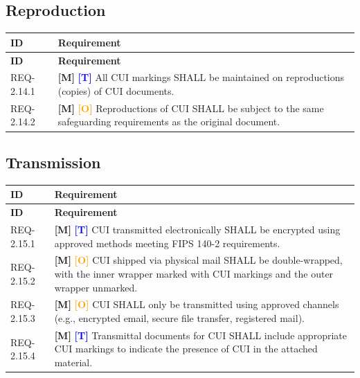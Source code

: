 \documentclass[11pt,letterpaper]{article}
\begin{document}
\subsection{Reproduction}

\begin{longtable}{@{}p{1.4cm}p{11.6cm}@{}}
\toprule
\textbf{ID} & \textbf{Requirement} \\
\midrule
\endfirsthead
\toprule
\textbf{ID} & \textbf{Requirement} \\
\midrule
\endhead

REQ-2.14.1 & \textcolor{mandatory}{\textbf{[M]}} \textcolor{blue}{\textbf{[T]}} All CUI markings SHALL be maintained on reproductions (copies) of CUI documents. \\[6pt]

REQ-2.14.2 & \textcolor{mandatory}{\textbf{[M]}} \textcolor{orange}{\textbf{[O]}} Reproductions of CUI SHALL be subject to the same safeguarding requirements as the original document. \\[6pt]

\bottomrule
\end{longtable}

\subsection{Transmission}

\begin{longtable}{@{}p{1.4cm}p{11.6cm}@{}}
\toprule
\textbf{ID} & \textbf{Requirement} \\
\midrule
\endfirsthead
\toprule
\textbf{ID} & \textbf{Requirement} \\
\midrule
\endhead

REQ-2.15.1 & \textcolor{mandatory}{\textbf{[M]}} \textcolor{blue}{\textbf{[T]}} CUI transmitted electronically SHALL be encrypted using approved methods meeting FIPS 140-2 requirements. \\[6pt]

REQ-2.15.2 & \textcolor{mandatory}{\textbf{[M]}} \textcolor{orange}{\textbf{[O]}} CUI shipped via physical mail SHALL be double-wrapped, with the inner wrapper marked with CUI markings and the outer wrapper unmarked. \\[6pt]

REQ-2.15.3 & \textcolor{mandatory}{\textbf{[M]}} \textcolor{orange}{\textbf{[O]}} CUI SHALL only be transmitted using approved channels (e.g., encrypted email, secure file transfer, registered mail). \\[6pt]

REQ-2.15.4 & \textcolor{mandatory}{\textbf{[M]}} \textcolor{blue}{\textbf{[T]}} Transmittal documents for CUI SHALL include appropriate CUI markings to indicate the presence of CUI in the attached material. \\[6pt]

\bottomrule
\end{longtable}
\end{document}
